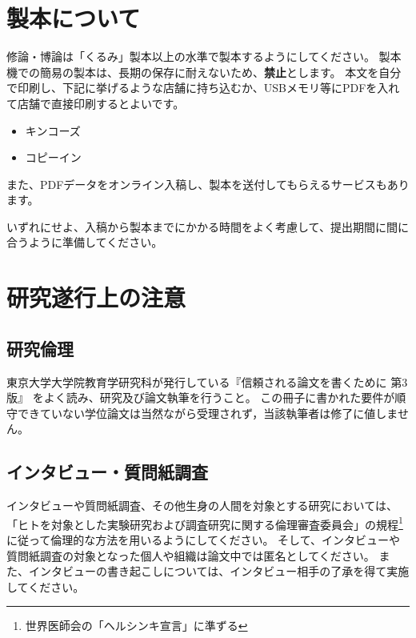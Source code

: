 
\chapter{製本について}
	\label{app:seihon}

	修論・博論は「くるみ」製本以上の水準で製本するようにしてください。
	製本機での簡易の製本は、長期の保存に耐えないため、\textbf{禁止}とします。
	本文を自分で印刷し、下記に挙げるような店舗に持ち込むか、USBメモリ等にPDFを入れて店舗で直接印刷するとよいです。

	\begin{itemize}
		\item キンコーズ
		\item コピーイン
	\end{itemize}

	また、PDFデータをオンライン入稿し、製本を送付してもらえるサービスもあります。

	いずれにせよ、入稿から製本までにかかる時間をよく考慮して、提出期間に間に合うように準備してください。

\chapter{研究遂行上の注意}\label{app:ethic}

	\section{研究倫理}
		\label{sec:echic}

		東京大学大学院教育学研究科が発行している『信頼される論文を書くために 第3版』
		をよく読み、研究及び論文執筆を行うこと。
		この冊子に書かれた要件が順守できていない学位論文は当然ながら受理されず，当該執筆者は修了に値しません。

	\section{インタビュー・質問紙調査}
		\label{sec:interview}

		インタビューや質問紙調査、その他生身の人間を対象とする研究においては、「ヒトを対象とした実験研究および調査研究に関する倫理審査委員会」の規程\footnote{世界医師会の「ヘルシンキ宣言」に準ずる}に従って倫理的な方法を用いるようにしてください。
		そして、インタビューや質問紙調査の対象となった個人や組織は論文中では匿名としてください。
		また、インタビューの書き起こしについては、インタビュー相手の了承を得て実施してください。


